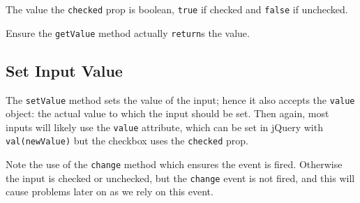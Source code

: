 \documentclass[
  10pt,
]{krantz}
\makeatletter
\newenvironment{Shaded}{\begin{snugshade}}{\end{snugshade}}
\newcommand{\AttributeTok}[1]{\textcolor[rgb]{0.61,0.61,0.61}{#1}}
\newcommand{\CommentTok}[1]{\textcolor[rgb]{0.37,0.37,0.37}{\textit{#1}}}
\newcommand{\ControlFlowTok}[1]{\textcolor[rgb]{0.27,0.27,0.27}{\textbf{#1}}}
\newcommand{\DataTypeTok}[1]{\textcolor[rgb]{0.27,0.27,0.27}{#1}}
\newcommand{\KeywordTok}[1]{\textcolor[rgb]{0.27,0.27,0.27}{\textbf{#1}}}
\newcommand{\NormalTok}[1]{#1}
\newcommand{\OperatorTok}[1]{\textcolor[rgb]{0.43,0.43,0.43}{\textbf{#1}}}
\newcommand{\StringTok}[1]{\textcolor[rgb]{0.5,0.5,0.5}{#1}}
\newcommand{\VariableTok}[1]{\textcolor[rgb]{0,0,0}{#1}}
\newenvironment{kframe}{%
\medskip{}
\setlength{\fboxsep}{.8em}
 \def\at@end@of@kframe{}%
 \ifinner\ifhmode%
  \def\at@end@of@kframe{\end{minipage}}%
  \begin{minipage}{\columnwidth}%
 \fi\fi%
 \def\FrameCommand##1{\hskip\@totalleftmargin \hskip-\fboxsep
 \colorbox{shadecolor}{##1}\hskip-\fboxsep
     \hskip-\linewidth \hskip-\@totalleftmargin \hskip\columnwidth}%
 \MakeFramed {\advance\hsize-\width
   \@totalleftmargin\z@ \linewidth\hsize
   \@setminipage}}%
 {\par\unskip\endMakeFramed%
 \at@end@of@kframe}
\renewenvironment{Shaded}{\begin{kframe}}{\end{kframe}}
\newenvironment{rmdblock}[1]
  {
  \begin{itemize}
  \renewcommand{\labelitemi}{
    \raisebox{-.7\height}[0pt][0pt]{
      {\setkeys{Gin}{width=3em,keepaspectratio}\texttt{[image: images/\#1]}}
    }
  }
  \setlength{\fboxsep}{1em}
  \begin{kframe}
  \item
  }
  {
  \end{kframe}
  \end{itemize}
  }
\newenvironment{rmdnote}
  {\begin{rmdblock}{note}}
  {\end{rmdblock}}
\makeatother
\begin{document}
The value the \texttt{checked} prop is boolean, \texttt{true} if checked and \texttt{false} if unchecked.

\begin{rmdnote}
Ensure the \texttt{getValue} method actually \texttt{return}s the value.
\end{rmdnote}

\hypertarget{shiny-input-set-value}{%
\subsection{Set Input Value}\label{shiny-input-set-value}}

The \texttt{setValue} method sets the value of the input; hence it also accepts the \texttt{value} object: the actual value to which the input should be set. Then again, most inputs will likely use the \texttt{value} attribute, which can be set in jQuery with \texttt{val(newValue)} but the checkbox uses the \texttt{checked} prop.

\begin{Shaded}
\end{Shaded}

Note the use of the \texttt{change} method which ensures the event is fired. Otherwise the input is checked or unchecked, but the \texttt{change} event is not fired, and this will cause problems later on as we rely on this event.
\end{document}

